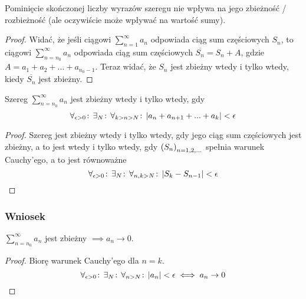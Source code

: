 \documentclass[9pt]{article}
\begin{document}
\begin{Twi}
    Pominięcie skończonej liczby wyrazów szeregu nie wpływa na jego zbieżność / rozbieżność (ale
    oczywiście może wpływać na wartość sumy).
\end{Twi}

\begin{proof}
    Widać, że jeśli ciągowi $\sum_{n = 1}^{\infty} a_n$ odpowiada ciąg sum częściowych $S_n$, to ciągowi
    $\sum_{n = n_0}^{\infty} a_n$ odpowiada ciąg sum częściowych $\overline{S_n} = S_n + A$, gdzie 
    $A = a_1 + a_2 + ... + a_{n_0-1}$. Teraz widać, że $S_n$ jest zbieżny wtedy i tylko wtedy, kiedy
    $\overline{S_n}$ jest zbieżny.
\end{proof}

\begin{Twi}
    Szereg $\sum_{n=n_0}^{\infty} a_n$ jest zbieżny wtedy i tylko wtedy, gdy
    \[
        \forall_{\epsilon > 0} \! : \, \exists_{N} \! : \, \forall_{k > n > N} \! : \, \left|a_n + a_{n+1} + ... + a_k \right| < \epsilon
    \]
\end{Twi}

\begin{proof}
    Szereg jest zbieżny wtedy i tylko wtedy, gdy jego ciąg sum częściowych jest zbieżny, a to jest
    wtedy i tylko wtedy, gdy $\left(S_n\right)_{n = 1,2,...}$ spełnia warunek Cauchy'ego, a to jest równoważne
    \[
        \forall_{\epsilon > 0} \! : \, \exists_{N} \! : \, \forall_{n, k > N} \! : \, \left|S_k - S_{n-1}\right| < \epsilon
    \]
\end{proof}

\subsubsection*{Wniosek}

$\sum_{n = n_0}^{\infty} a_n$ jest zbieżny $\implies a_n \to 0$.

\begin{proof}
    Biorę warunek Cauchy'ego dla $n=k$.
    \[
        \forall_{\epsilon > 0} \! : \,\exists_{N} \! : \,\forall_{n > N} \! : \, \left|a_n\right| < \epsilon
        \iff
        a_n \to 0
    \]
\end{proof}
\end{document}
